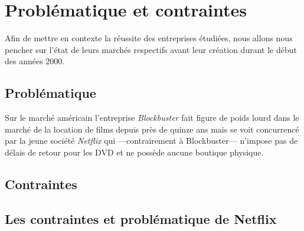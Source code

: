 \chapter{Problématique et contraintes}

Afin de mettre en contexte la réussite des entreprises étudiées, nous allons nous pencher sur l'état de leurs marchés respectifs avant leur création durant le début des années 2000.

\section{Problématique }

Sur le marché américain l'entreprise \textit{Blockbuster} fait figure de poids lourd dans le marché de la location de films depuis près de quinze ans mais se voit concurrencé par la jeune société \textit{Netflix} qui ---contrairement à Blockbuster--- n'impose pas de délais de retour pour les DVD et ne possède aucune boutique physique. 

\section{Contraintes}
\section{Les contraintes et problématique de Netflix}
